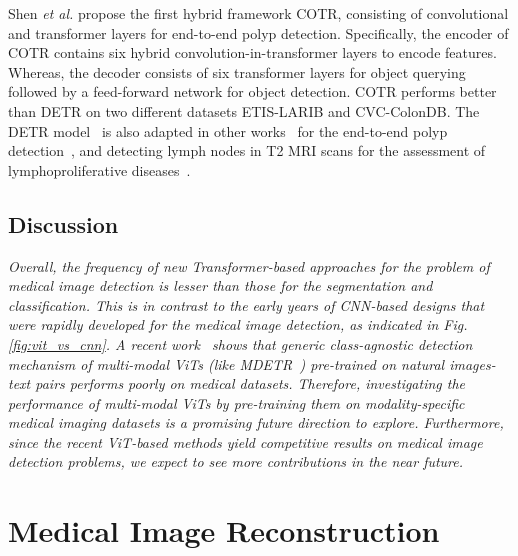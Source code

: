 \documentclass[10pt,journal,compsoc]{IEEEtran}
\begin{document}
Shen \textit{et al.} \cite{shen2021cotr} propose the first hybrid framework COTR, consisting of convolutional and transformer layers for end-to-end polyp detection. Specifically, the encoder of COTR contains six hybrid convolution-in-transformer layers to encode features. Whereas, the decoder consists of six transformer layers for object querying followed by a feed-forward network for object detection. COTR performs better than DETR on two different datasets ETIS-LARIB and CVC-ColonDB. The DETR model~\cite{zhu2020deformable} is also adapted in other works~\cite{liu2021transformer,mathai2021lymph} for the end-to-end polyp detection~\cite{liu2021transformer}, and detecting lymph nodes in T2 MRI scans for the assessment of lymphoproliferative diseases~\cite{mathai2021lymph}. 
\begin{tcolorbox}[top=0.5pt,left=0pt,size=minimal,boxrule = 0pt,breakable, enhanced]%
\subsection{\textbf{Discussion}}
 \hspace{0.75em}\textit{Overall, the frequency of new Transformer-based approaches for the problem of medical image detection is lesser than those for the segmentation and classification. This is in contrast to the early years of CNN-based designs that were rapidly developed for the medical image detection, as indicated in Fig. \ref{fig:vit_vs_cnn}. A recent work~\cite{maaz2021multi} shows that generic class-agnostic detection mechanism of multi-modal ViTs (like MDETR~\cite{kamath2021mdetr}) pre-trained on natural images-text pairs performs poorly on medical datasets. Therefore, investigating the performance of multi-modal ViTs by pre-training them on modality-specific medical imaging datasets is a promising future direction to explore. Furthermore, since the recent ViT-based methods yield competitive results on medical image detection problems, we expect to see more contributions in the near future.
}
\end{tcolorbox}


\section{Medical Image Reconstruction} \label{sec:rec}
\end{document}
